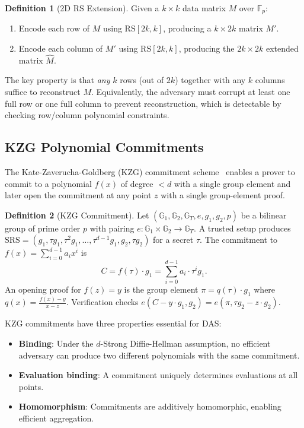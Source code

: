 \documentclass[11pt,a4paper]{article}
\theoremstyle{plain}
\theoremstyle{definition}
\newtheorem{definition}{Definition}[section]
\theoremstyle{remark}
\begin{document}
\begin{definition}[2D RS Extension]
Given a $k \times k$ data matrix $M$ over $\mathbb{F}_p$:
\begin{enumerate}
    \item Encode each row of $M$ using $\text{RS}[2k, k]$, producing a $k \times 2k$ matrix $M'$.
    \item Encode each column of $M'$ using $\text{RS}[2k, k]$, producing the $2k \times 2k$
          extended matrix $\hat{M}$.
\end{enumerate}
\end{definition}

The key property is that \emph{any} $k$ rows (out of $2k$) together with any $k$ columns
suffice to reconstruct $M$. Equivalently, the adversary must corrupt at least one full row
or one full column to prevent reconstruction, which is detectable by checking row/column
polynomial constraints.

\subsection{KZG Polynomial Commitments}
\label{sec:background:kzg}

The Kate-Zaverucha-Goldberg (KZG) commitment scheme~\cite{kate2010commitment} enables
a prover to commit to a polynomial $f(x)$ of degree $< d$ with a single group element
and later open the commitment at any point $z$ with a single group-element proof.

\begin{definition}[KZG Commitment]
Let $(\mathbb{G}_1, \mathbb{G}_2, \mathbb{G}_T, e, g_1, g_2, p)$ be a bilinear group of
prime order $p$ with pairing $e : \mathbb{G}_1 \times \mathbb{G}_2 \to \mathbb{G}_T$.
A trusted setup produces $\text{SRS} = (g_1, \tau g_1, \tau^2 g_1, \ldots, \tau^{d-1} g_1,
g_2, \tau g_2)$ for a secret $\tau$. The commitment to $f(x) = \sum_{i=0}^{d-1} a_i x^i$ is
\[
    C = f(\tau) \cdot g_1 = \sum_{i=0}^{d-1} a_i \cdot \tau^i g_1.
\]
An opening proof for $f(z) = y$ is the group element
$\pi = q(\tau) \cdot g_1$ where $q(x) = \frac{f(x) - y}{x - z}$.
Verification checks $e(C - y \cdot g_1, g_2) = e(\pi, \tau g_2 - z \cdot g_2)$.
\end{definition}

KZG commitments have three properties essential for DAS:
\begin{itemize}[leftmargin=*]
    \item \textbf{Binding}: Under the $d$-Strong Diffie-Hellman assumption, no efficient adversary
          can produce two different polynomials with the same commitment.
    \item \textbf{Evaluation binding}: A commitment uniquely determines evaluations at all points.
    \item \textbf{Homomorphism}: Commitments are additively homomorphic, enabling efficient
          aggregation.
\end{itemize}
\end{document}
